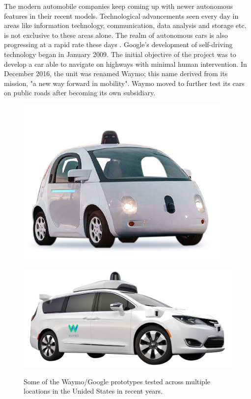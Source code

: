 The modern automobile companies keep coming up with newer autonomous features in their recent models. Technological advancements seen every day in areas like information technology, communication, data analysis and storage etc. is not exclusive to these areas alone. The realm of autonomous cars is also progressing at a rapid rate these days \cite{Bimbraw2015}. Google's development of self-driving technology began in January 2009. The initial objective of the project was to develop a car able to navigate on highways with minimal human intervention. In December 2016, the unit was renamed Waymo; this name derived from its mission, "a new way forward in mobility". Waymo moved to further test its cars on public roads after becoming its own subsidiary.
\begin{figure}[!h]
	\centering
	\begin{minipage}[t]{0.65\textwidth}
		\includegraphics[width=\textwidth]{../figure/veiculos0.png}
		\label{fig:veiculos0}
	\end{minipage}
	\begin{minipage}[t]{0.65\textwidth}
		\includegraphics[width=\textwidth]{../figure/veiculos1.png}
		\label{fig:veiculos1}
	\end{minipage}
	\caption{Some of the Waymo/Google prototypes tested across multiple locations in the Unided States in recent years.}
	\label{fig:waymo}
\end{figure}

